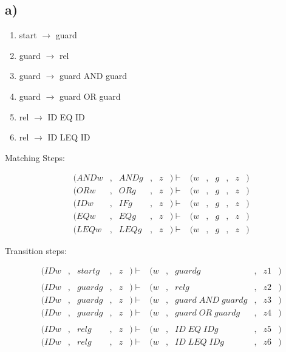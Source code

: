 \subsection*{a)}

\begin{enumerate}
\item start $\rightarrow$ guard
\item guard $\rightarrow$ rel
\item guard $\rightarrow$ guard AND guard
\item guard $\rightarrow$ guard OR guard
\item rel $\rightarrow$ ID EQ ID
\item rel $\rightarrow$ ID LEQ ID
\end{enumerate}

Matching Steps:

\begin{equation*}
  \begin{aligned}
          & (ANDw&, &ANDg&, &z &) \vdash   & (w&,  &g&, &z &) \\
          & (ORw&, &ORg&, &z &) \vdash   & (w&,  &g&, &z &) \\
          & (IDw&, &IFg&, &z &) \vdash   & (w&,  &g&, &z &) \\
          & (EQw&, &EQg&, &z &) \vdash   & (w&,  &g&, &z &) \\
          & (LEQw&, &LEQg&, &z &) \vdash   & (w&,  &g&, &z &)
\end{aligned}
\end{equation*}

Transition steps:

\begin{equation*}
  \begin{aligned}
          & (IDw&, &startg&, &z &) \vdash   & (w&,  &guardg&, &z1 &) \\
          & \\
          & (IDw&, &guardg&, &z &) \vdash   & (w&,  &relg&, &z2 &) \\
          & (IDw&, &guardg&, &z &) \vdash   & (w&,  &guard\;AND\;guardg&, &z3 &) \\
          & (IDw&, &guardg&, &z &) \vdash   & (w&,  &guard\;OR\;guardg&, &z4 &) \\
          & \\
          & (IDw&, &relg&, &z &) \vdash   & (w&,  &ID\;EQ\;IDg&, &z5 &) \\
          & (IDw&, &relg&, &z &) \vdash   & (w&,  &ID\;LEQ\;IDg&, &z6 &)
\end{aligned}
\end{equation*}

